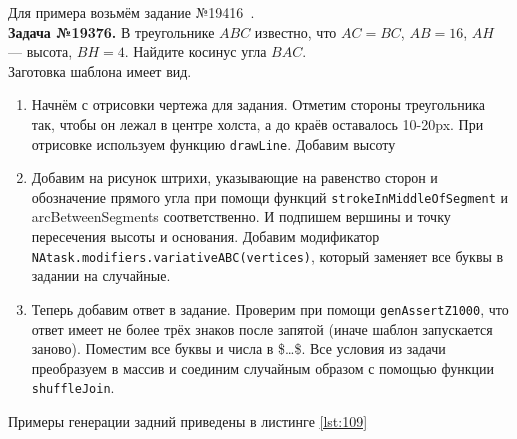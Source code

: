 Для примера возьмём задание №19416~\cite{egemath}.
\\
\textbf{Задача №19376.}
В треугольнике $ABC$ известно, что ${AC=BC}$, $AB=16$, $AH$ — высота, $BH=4$. Найдите косинус угла $BAC$.\\ 

Заготовка шаблона имеет вид.



\begin{enumerate}
    \item Начнём с отрисовки чертежа для задания. Отметим стороны треугольника так, чтобы он лежал в центре холста, а до краёв оставалось 10-20px. При отрисовке используем функцию \texttt{drawLine}. Добавим высоту 
     
    \item Добавим на рисунок штрихи, указывающие на равенство сторон и обозначение прямого угла при помощи функций \texttt{strokeInMiddleOfSegment} и arcBetweenSegments соответственно. И подпишем вершины и точку пересечения высоты и основания. Добавим модификатор \texttt{NAtask.modifiers.variativeABC(vertices)}, который заменяет все буквы в задании на случайные.
   

     
    \item Теперь добавим ответ в задание. Проверим при помощи \texttt{genAssertZ1000}, что ответ имеет не более трёх знаков после запятой (иначе шаблон запускается заново). Поместим все буквы и числа в \$\dots\$. Все условия из задачи преобразуем в массив и соединим случайным образом с помощью функции \texttt{shuffleJoin}.
     
\end{enumerate}

Примеры генерации задний приведены в листинге \ref{lst:109}
